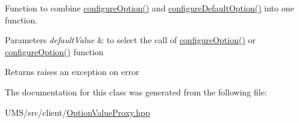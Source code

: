 Function to combine \hyperlink{classOptionValueProxy_ae6db8f1eb397361e86a37c45afca234f}{configureOption()} and \hyperlink{classOptionValueProxy_a2d4ef21b234a046918844158a5c9197f}{configureDefaultOption()} into one function. 


\begin{DoxyParams}{Parameters}
{\em defaultValue} & to select the call of \hyperlink{classOptionValueProxy_ae6db8f1eb397361e86a37c45afca234f}{configureOption()} or \hyperlink{classOptionValueProxy_ae6db8f1eb397361e86a37c45afca234f}{configureOption()} function \\
\hline
\end{DoxyParams}
\begin{DoxyReturn}{Returns}
raises an exception on error 
\end{DoxyReturn}


The documentation for this class was generated from the following file:\begin{DoxyCompactItemize}
\item 
UMS/src/client/\hyperlink{OptionValueProxy_8hpp}{OptionValueProxy.hpp}\end{DoxyCompactItemize}
